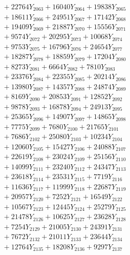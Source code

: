 \documentclass[a4paper,10pt]{article}
\begin{document}
{\begin{align}
&\;  + 22764 Y_{2063} + 16040 Y_{2064} + 19838 Y_{2065} \\[0.3ex]
&\;  + 18611 Y_{2066} + 24951 Y_{2067} + 17142 Y_{2068} \\[0.5ex]\allowbreak
&\;  + 19409 Y_{2069} + 21887 Y_{2070} + 15556 Y_{2071} \\[0.3ex]
&\;  + 9574 Y_{2072} + 20295 Y_{2073} + 10068 Y_{2074} \\[0.3ex]
&\;  + 9753 Y_{2075} + 16796 Y_{2076} + 24654 Y_{2077} \\[0.3ex]
&\;  + 18287 Y_{2078} + 18859 Y_{2079} + 17204 Y_{2080} \\[0.3ex]
&\;  + 8273 Y_{2081} + 6664 Y_{2082} + 7810 Y_{2083} \\[0.3ex]
&\;  + 23376 Y_{2084} + 22355 Y_{2085} + 20214 Y_{2086} \\[0.3ex]
&\;  + 13980 Y_{2087} + 14357 Y_{2088} + 24874 Y_{2089} \\[0.3ex]
&\;  + 8169 Y_{2090} + 20853 Y_{2091} + 12852 Y_{2092} \\[0.3ex]
&\;  + 9878 Y_{2093} + 16878 Y_{2094} + 24913 Y_{2095} \\[0.3ex]
&\;  + 25365 Y_{2096} + 14907 Y_{2097} + 14865 Y_{2098} \\[0.5ex]\allowbreak
&\;  + 7775 Y_{2099} + 7680 Y_{2100} + 21765 Y_{2101} \\[0.3ex]
&\;  + 7686 Y_{2102} + 25080 Y_{2103} + 10234 Y_{2104} \\[0.3ex]
&\;  + 12060 Y_{2105} + 15427 Y_{2106} + 24088 Y_{2107} \\[0.3ex]
&\;  + 22619 Y_{2108} + 23024 Y_{2109} + 25156 Y_{2110} \\[0.3ex]
&\;  + 14099 Y_{2111} + 23240 Y_{2112} + 24347 Y_{2113} \\[0.3ex]
&\;  + 23618 Y_{2114} + 23531 Y_{2115} + 7719 Y_{2116} \\[0.3ex]
&\;  + 11636 Y_{2117} + 11999 Y_{2118} + 22687 Y_{2119} \\[0.3ex]
&\;  + 20957 Y_{2120} + 7252 Y_{2121} + 16549 Y_{2122} \\[0.3ex]
&\;  + 10567 Y_{2123} + 12445 Y_{2124} + 25279 Y_{2125} \\[0.3ex]
&\;  + 21478 Y_{2126} + 10625 Y_{2127} + 23628 Y_{2128} \\[0.5ex]\allowbreak
&\;  + 7254 Y_{2129} + 21005 Y_{2130} + 24391 Y_{2131} \\[0.3ex]
&\;  + 7672 Y_{2132} + 21011 Y_{2133} + 23644 Y_{2134} \\[0.3ex]
&\;  + 12764 Y_{2135} + 18208 Y_{2136} + 9297 Y_{2137} \\[0.3ex]

\end{align}}
\end{document}
